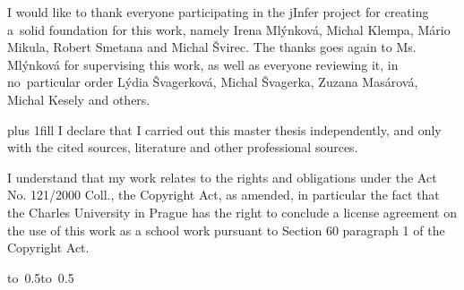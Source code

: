 \documentclass[a4paper,12pt,twoside]{report}
\theoremstyle{definition}
\let\openright=\clearpage
\begin{document}
\newpage %
\openright

\noindent
I would like to thank everyone participating in the jInfer project for creating a~solid foundation for this work, namely Irena Mlýn\-ko\-vá, Mi\-chal Klem\-pa, Má\-rio Mi\-ku\-la, Ro\-bert Sme\-ta\-na and Mi\-chal Švi\-rec. The thanks goes again to Ms. Mlýn\-ko\-vá for supervising this work, as well as everyone reviewing it, in no~particular order Lý\-dia Šva\-ger\-ko\-vá, Mi\-chal Šva\-ger\-ka, Zu\-za\-na Ma\-sá\-ro\-vá, Mi\-chal Ke\-se\-ly and others.

\newpage %
\vglue 0pt plus 1fill
\noindent
I declare that I carried out this master thesis independently, and only with the cited
sources, literature and other professional sources.

\medskip\noindent
I understand that my work relates to the rights and obligations under the Act No.
121/2000 Coll., the Copyright Act, as amended, in particular the fact that the Charles
University in Prague has the right to conclude a license agreement on the use of this
work as a school work pursuant to Section 60 paragraph 1 of the Copyright Act.

\vspace{10mm}

\hbox{\hbox to 0.5\hbox to 0.5}

\vspace{20mm}
\end{document}
